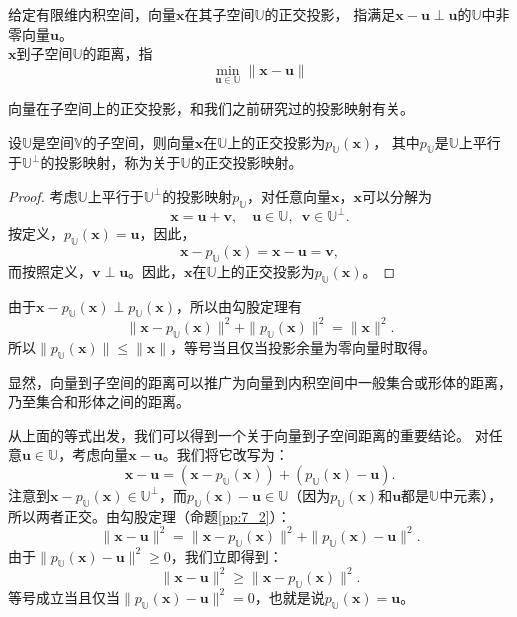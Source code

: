 \documentclass[12pt,UTF8]{ctexbook}
\begin{document}
\begin{df}\label{df:7_4}
    给定有限维内积空间，向量$\mathbf{x}$在其子空间$\mathbb{U}$的正交投影，
    指满足$\mathbf{x} - \mathbf{u} \perp \mathbf{u}$的$\mathbb{U}$中非零向量$\mathbf{u}$。\\
    $\mathbf{x}$到子空间$\mathbb{U}$的距离，指
    $$\min_{\mathbf{u}\in\mathbb{U}} \|\mathbf{x} - \mathbf{u}\|$$
\end{df}

向量在子空间上的正交投影，和我们之前研究过的投影映射有关。
\begin{pp}\label{pp:7_8}
    设$\mathbb{U}$是空间$\mathbb{V}$的子空间，则向量$\mathbf{x}$在$\mathbb{U}$上的正交投影为$p_\mathbb{U}(\mathbf{x})$，
    其中$p_\mathbb{U}$是$\mathbb{U}$上平行于$\mathbb{U}^\perp$的投影映射，称为关于$\mathbb{U}$的正交投影映射。
\end{pp}

\begin{proof} %
    考虑$\mathbb{U}$上平行于$\mathbb{U}^\perp$的投影映射$p_\mathbb{U}$，对任意向量$\mathbf{x}$，$\mathbf{x}$可以分解为
    $$ \mathbf{x} = \mathbf{u} + \mathbf{v}, \quad \mathbf{u} \in \mathbb{U}, \,\,\, \mathbf{v} \in \mathbb{U}^\perp . $$
    按定义，$p_\mathbb{U}(\mathbf{x}) = \mathbf{u}$，因此，
    $$ \mathbf{x} - p_\mathbb{U}(\mathbf{x}) = \mathbf{x} - \mathbf{u} = \mathbf{v},$$
    而按照定义，$\mathbf{v} \perp \mathbf{u}$。因此，$\mathbf{x}$在$\mathbb{U}$上的正交投影为$p_\mathbb{U}(\mathbf{x})$。

\end{proof}


由于$\mathbf{x} - p_\mathbb{U}(\mathbf{x}) \perp p_\mathbb{U}(\mathbf{x})$，所以由勾股定理有
$$ \| \mathbf{x} - p_\mathbb{U}(\mathbf{x})  \|^2 + \| p_\mathbb{U}(\mathbf{x}) \|^2 = \| \mathbf{x} \|^2.  $$
所以$\| p_\mathbb{U}(\mathbf{x}) \| \leqslant \| \mathbf{x} \|$，等号当且仅当投影余量为零向量时取得。

显然，向量到子空间的距离可以推广为向量到内积空间中一般集合或形体的距离，乃至集合和形体之间的距离。

从上面的等式出发，我们可以得到一个关于向量到子空间距离的重要结论。
对任意$\mathbf{u} \in \mathbb{U}$，考虑向量$\mathbf{x} - \mathbf{u}$。我们将它改写为：
$$ \mathbf{x} - \mathbf{u} = \left(\mathbf{x} - p_\mathbb{U}(\mathbf{x})\right) + \left(p_\mathbb{U}(\mathbf{x}) - \mathbf{u}\right). $$
注意到$\mathbf{x} - p_\mathbb{U}(\mathbf{x}) \in \mathbb{U}^\perp$，而$p_\mathbb{U}(\mathbf{x}) - \mathbf{u} \in \mathbb{U}$（因为$p_\mathbb{U}(\mathbf{x})$和$\mathbf{u}$都是$\mathbb{U}$中元素），
所以两者正交。由勾股定理（命题\ref{pp:7_2}）：
$$ \|\mathbf{x} - \mathbf{u}\|^2 = \|\mathbf{x} - p_\mathbb{U}(\mathbf{x})\|^2 + \|p_\mathbb{U}(\mathbf{x}) - \mathbf{u}\|^2. $$
由于$\|p_\mathbb{U}(\mathbf{x}) - \mathbf{u}\|^2 \geqslant 0$，我们立即得到：
$$ \|\mathbf{x} - \mathbf{u}\|^2 \geqslant \|\mathbf{x} - p_\mathbb{U}(\mathbf{x})\|^2. $$
等号成立当且仅当$\|p_\mathbb{U}(\mathbf{x}) - \mathbf{u}\|^2 = 0$，也就是说$p_\mathbb{U}(\mathbf{x}) = \mathbf{u}$。
\end{document}
